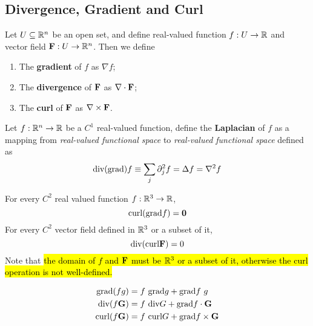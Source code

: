 \documentclass[11pt]{article}
\begin{document}
		\subsection{Divergence, Gradient and Curl}
			\begin{definition}
				Let $U \subseteq \mathbb{R}^n$ be an open set, and define real-valued function $f: U \to \mathbb{R}$ and vector field $\textbf{F}: U \to \mathbb{R}^n$. Then we define
				\begin{enumerate}
					\item The \textbf{gradient} of $f$ as $\nabla f$;
					\item The \textbf{divergence} of $\textbf{F}$ as $\nabla \cdot \textbf{F}$;
					\item The \textbf{curl} of $\textbf{F}$ as $\nabla \times \textbf{F}$.
				\end{enumerate}
			\end{definition}
			
			\begin{definition}
				Let $f: \mathbb{R}^n \to \mathbb{R}$ be a $C^1$ real-valued function, define the \textbf{Laplacian} of $f$ as a mapping from \emph{real-valued functional space} to \emph{real-valued functional space} defined as
				\begin{equation}
					\text{{div(grad)}} f \equiv \sum_{j} \partial_j^2 f = \Delta f = \nabla^2 f
				\end{equation}
			\end{definition}
			
			\begin{theorem}
				For every $C^2$ real valued function $f: \mathbb{R}^3 \to \mathbb{R}$,
				\begin{equation}
					\text{curl}(\text{grad} f) = \textbf{0}
				\end{equation}
				For every $C^2$ vector field defined in $\mathbb{R}^3$ or a subset of it, 
				\begin{equation}
					\text{div} (\text{curl} \textbf{F}) = 0
				\end{equation}
				Note that \hl{the domain of $f$ and $\textbf{F}$ must be $\mathbb{R}^3$ or a subset of it, otherwise the curl operation is not well-defined.}\\
			\end{theorem}
			
			\begin{theorem}
				\begin{align}
					\text{grad} (fg) &= f\ \text{grad} g + \text{grad} f\ g \\
					\text{div} (f \textbf{G}) &= f\ \text{div}{G} + \text{grad} f \cdot \textbf{G} \\
					\text{curl} (f \textbf{G}) &= f\ \text{curl}{G} + \text{grad} f \times \textbf{G}
				\end{align}
			\end{theorem}
			
\end{document}
